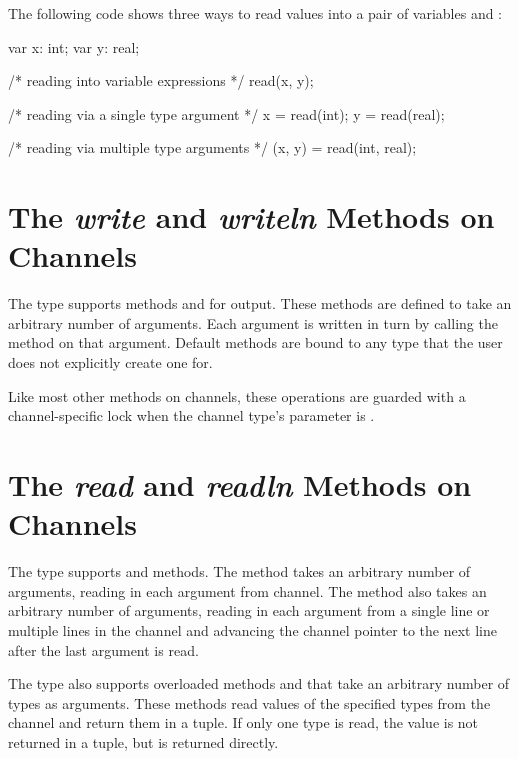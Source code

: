 \begin{example}
The following code shows three ways to read values into a pair of
variables  and :
\begin{chapel}
var x: int;
var y: real;

/* reading into variable expressions */
read(x, y);

/* reading via a single type argument */
x = read(int);
y = read(real);

/* reading via multiple type arguments */
(x, y) = read(int, real);
\end{chapel}
\end{example}

\section{The {\em write} and {\em writeln} Methods on Channels}
\label{IO_channel_write}

The  type supports methods  and 
for output.  These methods are defined to take an arbitrary number of
arguments.  Each argument is written in turn by calling
the  method on that argument.
Default  methods are bound to any type that the user
does not explicitly create one for.

Like most other methods on channels,
these operations are guarded with a channel-specific lock
when the channel type's  parameter is .


\section{The {\em read} and {\em readln} Methods on Channels}
\label{IO_channel_read}

The  type supports  and  methods.
The  method takes an arbitrary number of arguments, reading
in each argument from channel.  The  method also
takes an arbitrary number of arguments, reading in each argument
from a single line or multiple lines in the channel and 
advancing the channel pointer to the next line after the last argument 
is read.

The  type also supports overloaded methods 
and  that take an arbitrary number of types as arguments.
These methods read values of the specified types from the channel and
return them in a tuple.  If only one type is read, the value is not
returned in a tuple, but is returned directly.

